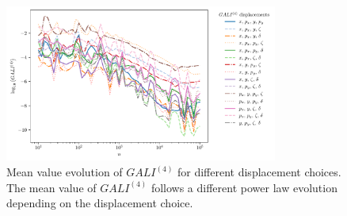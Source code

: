 \begin{figure}
    \centering
    \includegraphics[width=0.8\textwidth]{6_lhc_dynamic_indicators/figs/evolution_gali_4_stable.pdf}
    \caption{Mean value evolution of $GALI^{(4)}$ for different displacement choices. The mean value of $GALI^{(4)}$ follows a different power law evolution depending on the displacement choice.}
    \label{fig:gali4}
\end{figure}

